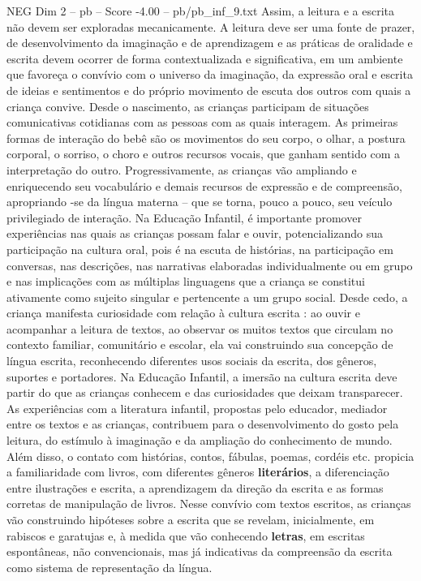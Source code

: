 \begin{textsample}{NEG Dim 2 – pb – Score -4.00 – pb/pb\_inf\_9.txt}
Assim, a leitura e a escrita não devem ser exploradas mecanicamente.
A leitura deve ser uma fonte de prazer, de desenvolvimento da imaginação e de aprendizagem e as práticas de oralidade e escrita devem ocorrer de forma contextualizada e significativa, em um ambiente que favoreça o convívio com o universo da imaginação, da expressão oral e escrita de ideias e sentimentos e do próprio movimento de escuta dos outros com quais a criança convive.
Desde o nascimento, as crianças participam de situações comunicativas cotidianas com as pessoas com as quais interagem.
As primeiras formas de interação do bebê são os movimentos do seu corpo, o olhar, a postura corporal, o sorriso, o choro e outros recursos vocais, que ganham sentido com a interpretação do outro.
Progressivamente, as crianças vão ampliando e enriquecendo seu vocabulário e demais recursos de expressão e de compreensão, apropriando -se da língua materna – que se torna, pouco a pouco, seu veículo privilegiado de interação.
Na Educação Infantil, é importante promover experiências nas quais as crianças possam falar e ouvir, potencializando sua participação na cultura oral, pois é na escuta de histórias, na participação em conversas, nas descrições, nas narrativas elaboradas individualmente ou em grupo e nas implicações com as múltiplas linguagens que a criança se constitui ativamente como sujeito singular e pertencente a um grupo social.
Desde cedo, a criança manifesta curiosidade com relação à cultura escrita : ao ouvir e acompanhar a leitura de textos, ao observar os muitos textos que circulam no contexto familiar, comunitário e escolar, ela vai construindo sua concepção de língua escrita, reconhecendo diferentes usos sociais da escrita, dos gêneros, suportes e portadores.
Na Educação Infantil, a imersão na cultura escrita deve partir do que as crianças conhecem e das curiosidades que deixam transparecer.
As experiências com a literatura infantil, propostas pelo educador, mediador entre os textos e as crianças, contribuem para o desenvolvimento do gosto pela leitura, do estímulo à imaginação e da ampliação do conhecimento de mundo.
Além disso, o contato com histórias, contos, fábulas, poemas, cordéis etc. propicia a familiaridade com livros, com diferentes gêneros \textbf{literários}, a diferenciação entre ilustrações e escrita, a aprendizagem da direção da escrita e as formas corretas de manipulação de livros.
Nesse convívio com textos escritos, as crianças vão construindo hipóteses sobre a escrita que se revelam, inicialmente, em rabiscos e garatujas e, à medida que vão conhecendo \textbf{letras}, em escritas espontâneas, não convencionais, mas já indicativas da compreensão da escrita como sistema de representação da língua.

\end{textsample}
